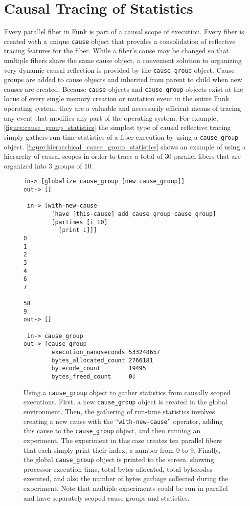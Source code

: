 \section{Causal Tracing of Statistics}

Every parallel fiber in Funk is part of a causal scope of execution.
Every fiber is created with a unique {\tt{cause}} object that provides
a consolidation of reflective tracing features for the fiber.  While a
fiber's cause may be changed so that multiple fibers share the same
cause object, a convenient solution to organizing very dynamic causal
reflection is provided by the {\tt{cause\_group}} object.  Cause
groups are added to cause objects and inherited from parent to child
when new causes are created.  Because {\tt{cause}} objects and
{\tt{cause\_group}} objects exist at the locus of every single memory
creation or mutation event in the entire Funk operating system, they
are a valuable and necessarily efficient means of tracing any event
that modifies any part of the operating system.  For example,
{\mbox{\autoref{figure:cause_group_statistics}}} the simplest type of
causal reflective tracing simply gathers run-time statistics of a
fiber execution by using a {\tt{cause\_group}} object.
{\mbox{\autoref{figure:hierarchical_cause_group_statistics}}} shows an
example of using a hierarchy of causal scopes in order to trace a
total of $30$ parallel fibers that are organized into $3$ groups of
$10$.
\begin{figure}[h]
\centering
{\small
\begin{Verbatim}[frame=single]
 in-> [globalize cause_group [new cause_group]]
out-> []

 in-> [with-new-cause
        [have [this-cause] add_cause_group cause_group]
        [partimes [i 10]
          [print i]]]
0
1
2
3
4
6
7

58
9
out-> []

 in-> cause_group
out-> [cause_group
        execution_nanoseconds 533248657
        bytes_allocated_count 2766181
        bytecode_count        19495
        bytes_freed_count     0]
\end{Verbatim}
}
\caption[Using a {\tt{cause\_group}} object to gather statistics from
  causally scoped executions.]{Using a {\tt{cause\_group}} object to
  gather statistics from causally scoped executions.  First, a new
  {\tt{cause\_group}} object is created in the global environment.
  Then, the gathering of run-time statistics involves creating a new
  cause with the ``{\tt{with-new-cause}}'' operator, adding this cause
  to the {\tt{cause\_group}} object, and then running an experiment.
  The experiment in this case creates ten parallel fibers that each
  simply print their index, a number from $0$ to $9$.  Finally, the
  global {\tt{cause\_group}} object is printed to the screen, showing
  processor execution time, total bytes allocated, total bytecodes
  executed, and also the number of bytes garbage collected during the
  experiment.  Note that multiple experiments could be run in parallel
  and have separately scoped cause groups and statistics.}
\label{figure:cause_group_statistics}
\end{figure}
